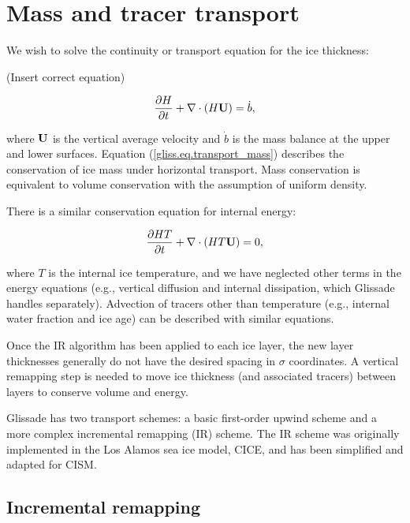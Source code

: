 
\section{Mass and tracer transport}
\label{sc:glissade-transport}

We wish to solve the continuity or transport equation for the ice thickness:

(Insert correct equation)

\begin{equation}
  \label{gliss.eq.transport_mass}
  \frac{\partial H}{\partial t} + \nabla \cdot (H {\bf U}) = \dot{b},
\end{equation}

\noindent
where ${\bf U}$ is the vertical average velocity and $\dot{b}$ is the 
mass balance at the upper and lower surfaces.
Equation (\ref{gliss.eq.transport_mass}) describes the conservation of
ice mass under horizontal transport.  
Mass conservation is equivalent to volume conservation with the assumption
of uniform density.

There is a similar conservation equation for internal energy:

\begin{equation}
  \label{gliss.eq.transport_energy}
  \frac{\partial{H T}}{\partial t} + \nabla \cdot (H T {\bf U}) = 0,
\end{equation}

where $T$ is the internal ice temperature, and we have neglected other terms in the
energy equations (e.g., vertical diffusion and internal dissipation, which Glissade handles
separately).
Advection of tracers other than temperature (e.g., internal water fraction and ice age)
can be described with similar equations.


Once the IR algorithm has been applied to each ice layer, the new layer thicknesses
generally do not have the desired spacing in $\sigma$ coordinates.
A vertical remapping step is needed to move ice thickness (and associated
tracers) between layers to conserve volume and energy.

Glissade has two transport schemes: a basic first-order
upwind scheme and a more complex incremental remapping (IR) scheme.
The IR scheme \citep{Dukowicz2000, Lipscomb2004} 
was originally implemented in the Los Alamos sea ice model, CICE,
and has been simplified and adapted for CISM.  

\subsection{Incremental remapping}
\label{sc:incremental_remapping}

